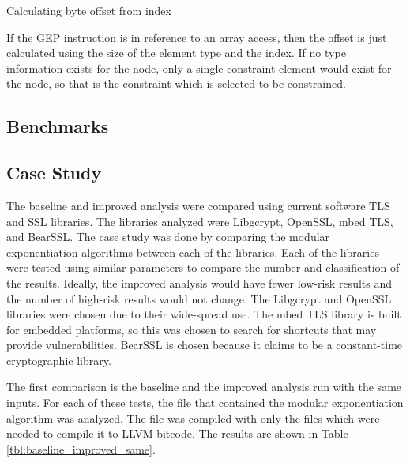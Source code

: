 \documentclass[11pt,a4paper]{article}
\begin{document}
\begin{algorithm}
  \caption{Calculating byte offset from index}
  \label{alg:find_offset}
  
\end{algorithm}

If the GEP instruction is in reference to an array access, then the offset is
just calculated using the size of the element type and the index. If no type
information exists for the node, only a single constraint element would exist
for the node, so that is the constraint which is selected to be constrained. 

\subsection{Benchmarks}

\subsection{Case Study}
The baseline and improved analysis were compared using current software TLS and
SSL libraries. The libraries analyzed were Libgcrypt, OpenSSL, mbed TLS, and
BearSSL. The case study was done by comparing the modular exponentiation
algorithms between each of the libraries. Each of the libraries were tested
using similar parameters to compare the number and classification of the
results. Ideally, the improved analysis would have fewer low-risk results and
the number of high-risk results would not change. The Libgcrypt and OpenSSL
libraries were chosen due to their wide-spread use. The mbed TLS library is
built for embedded platforms, so this was chosen to search for shortcuts that
may provide vulnerabilities. BearSSL is chosen because it claims to be a
constant-time cryptographic library.

The first comparison is the baseline and the improved analysis run with the same
inputs. For each of these tests, the file that contained the modular
exponentiation algorithm was analyzed. The file was compiled with only the
files which were needed to compile it to LLVM bitcode. The results are shown in
Table \ref{tbl:baseline_improved_same}.
\end{document}

